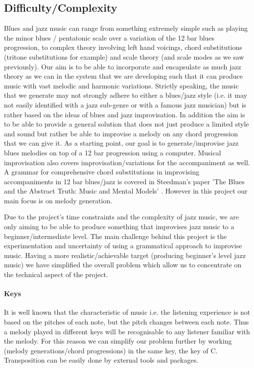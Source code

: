\documentclass[pdftex,12pt,a4paper]{report}
\begin{document}
\subsection{Difficulty/Complexity}
Blues and jazz music can range from something extremely simple such as playing the minor blues / pentatonic scale over a variation of the 12 bar blues progression, to complex theory involving left hand voicings, chord substitutions (tritone substitutions for example) and scale theory (and scale modes as we saw previously). Our aim is to be able to incorporate and encapsulate as much jazz theory as we can in the system that we are developing such that it can produce music with vast melodic and harmonic variations. Strictly speaking, the music that we generate may not strongly adhere to either a blues/jazz style (i.e. it may not easily identified with a jazz sub-genre or with a famous jazz musician) but is rather based on the ideas of blues and jazz improvisation. In addition the aim is to be able to provide a general solution that does not just produce a limited style and sound but rather be able to improvise a melody on any chord progression that we can give it. As a starting point, our goal is to generate/improvise jazz blues melodies on top of a 12 bar progression using a computer. Musical improvisation also covers improvisation/variations for the accompaniment as well. A grammar for comprehensive chord substitutions in improvising accompaniments in 12 bar blues/jazz is covered in Steedman's paper 'The Blues and the Abstract Truth: Music and Mental Models' \cite{steedman96}. However in this project our main focus is on melody generation.

Due to the project's time constraints and the complexity of jazz music, we are only aiming to be able to produce something that improvises jazz music to a beginner/intermediate level. The main challenge behind this project is the experimentation and uncertainty of using a grammatical approach to improvise music. Having a more realistic/achievable target (producing beginner's level jazz music) we have simplified the overall problem which allow us to concentrate on the technical aspect of the project.

\paragraph{Keys}
It is well known that the characteristic of music i.e. the listening experience is not based on the pitches of each note, but the pitch changes between each note. Thus a melody played in different keys will be recognisable to any listener familiar with the melody. For this reason we can simplify our problem further by working (melody generations/chord progressions) in the same key, the key of C. Transposition can be easily done by external tools and packages.
\end{document}
